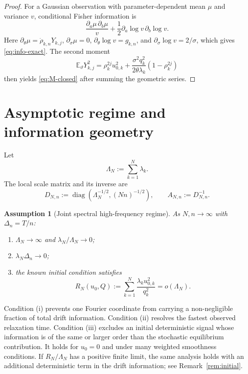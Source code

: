 \documentclass[11pt]{article}
\newtheorem{assumption}{Assumption}[section]
\theoremstyle{remark}
\newcommand{\E}{\mathbb E}
\newcommand{\diag}{\operatorname{diag}}
\newcommand{\1}{\mathbf 1}
\newcommand{\LamN}{\Lambda_N}
\newcommand{\Dn}{D_{N,n}}
\newcommand{\An}{A_{N,n}}
\newcommand{\vart}{\vartheta}
\begin{document}
\begin{proof}
For a Gaussian observation with parameter-dependent mean $\mu$ and variance $v$, conditional Fisher information is
\[
 \frac{\partial_a\mu\,\partial_b\mu}{v}
 +\frac12\partial_a\log v\,\partial_b\log v.
\]
Here $\partial_\theta\mu=\dot\rho_{k,n}Y_{k,j}$, $\partial_\sigma\mu=0$, $\partial_\theta\log v=g_{k,n}$, and $\partial_\sigma\log v=2/\sigma$, which gives \eqref{eq:info-exact}.  The second moment
\[
 \E_\vart Y_{k,j}^2
 =\rho_k^{2j}u_{0,k}^2
 +\frac{\sigma^2q_k^2}{2\theta\lambda_k}(1-\rho_k^{2j})
\]
then yields \eqref{eq:M-closed} after summing the geometric series.
\end{proof}

\section{Asymptotic regime and information geometry}

Let
\[
 \LamN:=\sum_{k=1}^N\lambda_k.
\]
The local scale matrix and its inverse are
\begin{equation}\label{eq:scales}
 \Dn:=\diag\!\left(\LamN^{-1/2},(Nn)^{-1/2}\right),
 \qquad
 \An:=\Dn^{-1}.
\end{equation}

\begin{assumption}[Joint spectral high-frequency regime]\label{ass:regime}
As $N,n\to\infty$ with $\Delta_n=T/n$:
\begin{enumerate}[label=(\roman*)]
 \item $\LamN\to\infty$ and $\lambda_N/\LamN\to0$;
 \item $\lambda_N\Delta_n\to0$;
 \item the known initial condition satisfies
 \begin{equation}\label{eq:initial-negligible}
 R_N(u_0,Q)
 :=\sum_{k=1}^N\frac{\lambda_ku_{0,k}^2}{q_k^2}
 =o(\LamN).
 \end{equation}
\end{enumerate}
\end{assumption}

Condition (i) prevents one Fourier coordinate from carrying a non-negligible fraction of total drift information.  Condition (ii) resolves the fastest observed relaxation time.  Condition (iii) excludes an initial deterministic signal whose information is of the same or larger order than the stochastic equilibrium contribution.  It holds for $u_0=0$ and under many weighted smoothness conditions.  If $R_N/\LamN$ has a positive finite limit, the same analysis holds with an additional deterministic term in the drift information; see Remark~\ref{rem:initial}.
\end{document}
